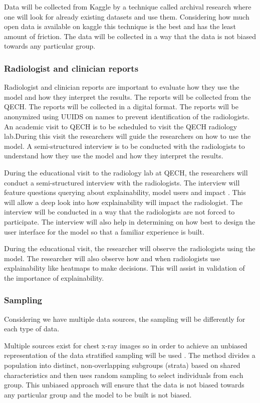 \documentclass[12pt,a4paper]{article}
\begin{document}
Data will be collected from Kaggle by a technique called archival research where one will look for already existing datasets and use them. Considering how much open data is available on kaggle this technique is the best and has the least amount of friction. The data will be collected in a way that the data is not biased towards any particular group.

\subsubsection{Radiologist and clinician reports}
Radiologist and clinician reports are important to evaluate how they use the model and how they interpret the results. The reports will be collected from the QECH. The reports will be collected in a digital format. The reports will be anonymized using UUIDS on names to prevent identification of the radiologists. 
An academic visit to QECH is to be scheduled to visit the QECH radiology lab.During this visit the researchers will guide the researchers on how to use the model. A semi-structured interview is to be conducted with the radiologists to understand how they use the model and how they interpret the results.  

During the educational visit to the radiology lab at QECH, the researchers will conduct a semi-structured interview with the radiologists. The interview will feature questions querying about explainability, model users and impact . This will allow a deep look into how explainability will impact the radiologist. The interview will be conducted in a way that the radiologists are not forced to participate. The interview will also help in determining on how best to design the user interface for the model so that a familiar experience is built.

During the educational visit, the researcher will observe the radiologists using the model. The researcher will also observe how and when radiologists use explainability like heatmaps to make decisions. This will assist in validation of the importance of explainability. 

\subsubsection{Sampling}
Considering we have multiple data sources, the sampling will be differently for each type of data. 

Multiple sources exist for chest x-ray images so in order to achieve an unbiased representation of the data stratified sampling will be used \citep{PennStateIct}. The method divides a population into distinct, non-overlapping subgroups (strata) based on shared characteristics and then uses random sampling to select individuals from each group. This unbiased approach will ensure that the data is not biased towards any particular group and the model to be built is not biased.
\end{document}
